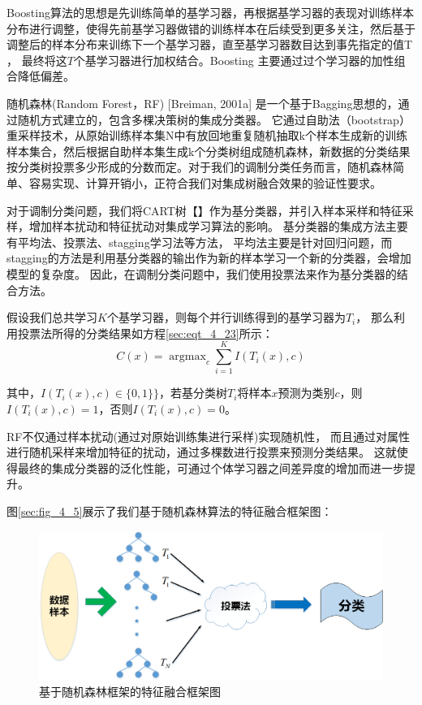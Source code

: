 Boosting算法的思想是先训练简单的基学习器，再根据基学习器的表现对训练样本分布进行调整，使得先前基学习器做错的训练样本在后续受到更多关注，然后基于调整后的样本分布来训练下一个基学习器，直至基学习器数目达到事先指定的值T ， 最终将这$T$个基学习器进行加权结合。Boosting 主要通过过个学习器的加性组合降低偏差。\par

随机森林(Random Forest，RF) [Breiman, 2001a] 是一个基于Bagging思想的，通过随机方式建立的，包含多棵决策树的集成分类器。
它通过自助法（bootstrap）重采样技术，从原始训练样本集N中有放回地重复随机抽取k个样本生成新的训练样本集合，然后根据自助样本集生成k个分类树组成随机森林，新数据的分类结果按分类树投票多少形成的分数而定。对于我们的调制分类任务而言，随机森林简单、容易实现、计算开销小，正符合我们对集成树融合效果的验证性要求。\par


对于调制分类问题，我们将CART树【】作为基分类器，并引入样本采样和特征采样，增加样本扰动和特征扰动对集成学习算法的影响。
基分类器的集成方法主要有平均法、投票法、stagging学习法等方法，
平均法主要是针对回归问题，而stagging的方法是利用基分类器的输出作为新的样本学习一个新的分类器，会增加模型的复杂度。
因此，在调制分类问题中，我们使用投票法来作为基分类器的结合方法。\par

假设我们总共学习$K$个基学习器，则每个并行训练得到的基学习器为$T_{i}$，
那么利用投票法所得的分类结果如方程\ref{sec:eqt_4_23}所示：
\begin{equation}
	C(x) = \mathop{\arg\max}_{c} \sum_{i=1}^{K} I(T_i(x), c)
\end{equation}

其中，$I(T_i(x), c) \in \{0, 1\}\}$，若基分类树$T_{i}$将样本$x$预测为类别$c$，则$I(T_i(x), c)=1$，否则$I(T_i(x), c)=0$。\par
RF不仅通过样本扰动(通过对原始训练集进行采样)实现随机性，
而且通过对属性进行随机采样来增加特征的扰动，通过多棵数进行投票来预测分类结果。
这就使得最终的集成分类器的泛化性能，可通过个体学习器之间差异度的增加而进一步提升。\par
图\ref{sec:fig_4_5}展示了我们基于随机森林算法的特征融合框架图：
\begin{figure}[!h]
	\centering
	\includegraphics[scale=0.5]{figures/chapter_4/Tree_combine}
	\caption{基于随机森林框架的特征融合框架图}\label{sec:fig_4_4}
\end{figure}



